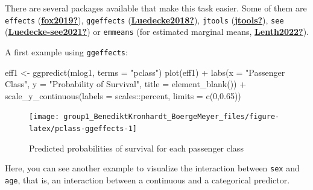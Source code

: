 \documentclass[
  11pt,
  a4paper,
  twoside]{scrbook}
\newenvironment{Shaded}{\begin{snugshade}}{\end{snugshade}}
\newcommand{\AttributeTok}[1]{\textcolor[rgb]{0.77,0.63,0.00}{#1}}
\newcommand{\DecValTok}[1]{\textcolor[rgb]{0.00,0.00,0.81}{#1}}
\newcommand{\FloatTok}[1]{\textcolor[rgb]{0.00,0.00,0.81}{#1}}
\newcommand{\FunctionTok}[1]{\textcolor[rgb]{0.00,0.00,0.00}{#1}}
\newcommand{\NormalTok}[1]{#1}
\newcommand{\OtherTok}[1]{\textcolor[rgb]{0.56,0.35,0.01}{#1}}
\newcommand{\SpecialCharTok}[1]{\textcolor[rgb]{0.00,0.00,0.00}{#1}}
\newcommand{\StringTok}[1]{\textcolor[rgb]{0.31,0.60,0.02}{#1}}
\begin{document}
There are several packages available that make this task easier. Some of them are \texttt{effects} (\protect\hyperlink{ref-fox2019}{\textbf{fox2019?}}), \texttt{ggeffects} (\protect\hyperlink{ref-Luedecke2018}{\textbf{Luedecke2018?}}), \texttt{jtools} (\protect\hyperlink{ref-jtools}{\textbf{jtools?}}), \texttt{see} (\protect\hyperlink{ref-Luedecke-see2021}{\textbf{Luedecke-see2021?}}) or \texttt{emmeans} (for estimated marginal means, \protect\hyperlink{ref-Lenth2022}{\textbf{Lenth2022?}}).

A first example using \texttt{ggeffects}:

\linespread{1}

\begin{Shaded}
\begin{Highlighting}[]
\NormalTok{eff1 }\OtherTok{\textless{}{-}} \FunctionTok{ggpredict}\NormalTok{(mlog1, }\AttributeTok{terms =} \StringTok{"pclass"}\NormalTok{)}
\FunctionTok{plot}\NormalTok{(eff1) }\SpecialCharTok{+} \FunctionTok{labs}\NormalTok{(}\AttributeTok{x =} \StringTok{"Passenger Class"}\NormalTok{, }\AttributeTok{y =} \StringTok{"Probability of Survival"}\NormalTok{,}
                  \AttributeTok{title =} \FunctionTok{element\_blank}\NormalTok{()) }\SpecialCharTok{+}
    \FunctionTok{scale\_y\_continuous}\NormalTok{(}\AttributeTok{labels =}\NormalTok{ scales}\SpecialCharTok{::}\NormalTok{percent, }\AttributeTok{limits =} \FunctionTok{c}\NormalTok{(}\DecValTok{0}\NormalTok{,}\FloatTok{0.65}\NormalTok{))}
\end{Highlighting}
\end{Shaded}

\linespread{1}

\begin{figure}[H]

{\centering \texttt{[image: group1\_BenediktKronhardt\_BoergeMeyer\_files/figure-latex/pclass-ggeffects-1]} 

}

\caption{Predicted probabilities of survival for each passenger class}\label{fig:pclass-ggeffects}
\end{figure}

Here, you can see another example to visualize the interaction between \texttt{sex} and \texttt{age}, that is, an interaction between a continuous and a categorical predictor.

\linespread{1}
\end{document}
